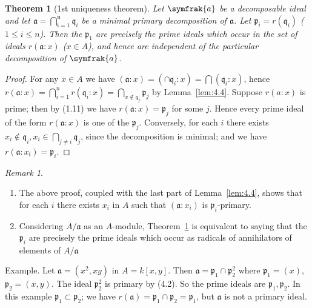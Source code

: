 \documentclass{standalone}
\newtheorem{theorem}{Theorem}[chapter]
\theoremstyle{definition}
\theoremstyle{remark}
\newtheorem*{remark}{Remark}
\begin{document}
\begin{theorem}
  [1st uniqueness theorem]\label{thm:4.5} Let $\symfrak{a}$ be a decomposable ideal and let
  $\mathfrak{a}=\bigcap_{\mathfrak{i}=1}^{\mathfrak{n}} \mathfrak{q}_{i}$ be a
  minimal primary decomposition of $\mathfrak{a}$. Let
  $\mathfrak{p}_{i}=r\left(\mathfrak{q}_{i}\right)$ ($1 \leq i \leq n$).
  Then the $\mathfrak{p}_{1}$ are precisely the prime ideals which occur in the
  set of ideals $r(\mathfrak{a}: x)$ ($x \in A$), and hence are independent of
  the particular decomposition of $\symfrak{a}$.
\end{theorem}
\begin{proof}
  For any $x \in A$ we have $(\mathfrak{a}: x)=(\cap \mathfrak{q}_{i}:
    x)=\bigcap(\mathfrak{q}_{i}: x)$, hence $r(\mathfrak{a}: x)=\bigcap_{i=1}^{n} r(\mathfrak{q}_{i}: x)=\bigcap_{x \not\in q_{j}}
  \mathfrak{p}_{j}$ by Lemma~\ref{lem:4.4}. Suppose $r(a: x)$ is prime; then by (1.11) we have
  $r(\mathfrak{a}: x)=\mathfrak{p}_{j}$ for some $j$. Hence every prime ideal of
  the form $r(\mathfrak{a}: x)$ is one of the $\mathfrak{p}_{j}$. Conversely, for
  each $i$ there exists $x_{i} \notin \mathfrak{q}_{i}, x_{i} \in \bigcap_{j \neq
    i} \mathfrak{q}_{j}$, since the decomposition is minimal; and we have
  $r(\mathfrak{a}: x_{\mathfrak{i}})=\mathfrak{p}_{i}$.

\end{proof}
\begin{remark}
  \begin{enumerate}
  \item The above proof, coupled with the last part of Lemma~\ref{lem:4.4},
    shows that for each $i$ there exists $x_{i}$ in $A$ such that
    $(\mathfrak{a}:x_{i})$ is $\mathfrak{p}_{i}$-primary.
  \item Considering $A / \mathfrak{a}$ as an $A$-module, Theorem~\ref{thm:4.5}
    is equivalent to saying that the $\mathfrak{p}_{i}$ are precisely the prime
    ideals which occur as radicals of annihilators of elements of $A / \mathfrak{a}$
  \end{enumerate}
\end{remark}
Example. Let $\mathfrak{a}=\left(x^{2}, x y\right)$ in $A=k[x, y]$. Then
$\mathfrak{a}=\mathfrak{p}_{1} \cap \mathfrak{p}_{2}^{2}$ where
$\mathfrak{p}_{1}=(x)$, $\mathfrak{p}_{2}=(x, y)$. The ideal
$\mathfrak{p}_{2}^{2}$ is primary by (4.2). So the prime ideals are
$\mathfrak{p}_{1}, \mathfrak{p}_{2}$. In this example $\mathfrak{p}_{1} \subset
\mathfrak{p}_{2}$; we have $r(\mathfrak{a})=\mathfrak{p}_{1} \cap
\mathfrak{p}_{2}=\mathfrak{p}_{1}$, but $\mathfrak{a}$ is not a primary ideal.
\end{document}
